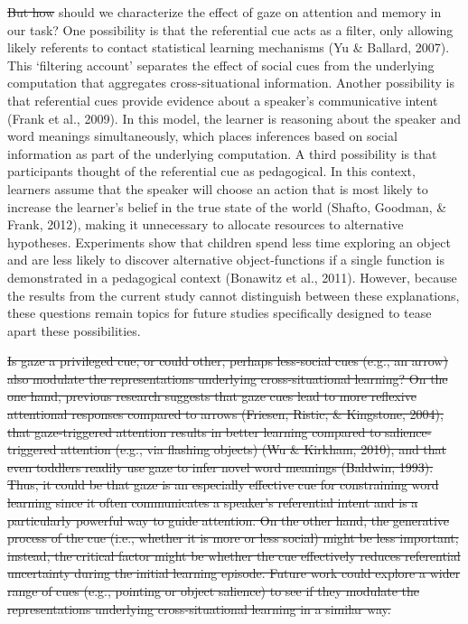 \documentclass[authoryear, review]{elsarticle}
\providecommand{\DIFaddtex}[1]{{\protect\color{blue}\uwave{#1}}} %
\providecommand{\DIFdeltex}[1]{{\protect\color{red}\sout{#1}}}                      %
\providecommand{\DIFaddbegin}{} %
\providecommand{\DIFaddend}{} %
\providecommand{\DIFdelbegin}{} %
\providecommand{\DIFdelend}{} %
\providecommand{\DIFadd}[1]{\texorpdfstring{\DIFaddtex{#1}}{#1}} %
\providecommand{\DIFdel}[1]{\texorpdfstring{\DIFdeltex{#1}}{}} %
\begin{document}
\DIFdelbegin \DIFdel{But how }\DIFdelend \DIFaddbegin \DIFadd{How }\DIFaddend should we characterize the effect of gaze on attention and memory in
our task? One possibility is that the referential cue acts as a filter,
only allowing likely referents to contact statistical learning
mechanisms (Yu \& Ballard, 2007). This `filtering account' separates the
effect of social cues from the underlying computation that aggregates
cross-situational information. Another possibility is that referential
cues provide evidence about a speaker's communicative intent (Frank et
al., 2009). In this model, the learner is reasoning about the speaker
and word meanings simultaneously, which places inferences based on
social information as part of the underlying computation. A third
possibility is that participants thought of the referential cue as
pedagogical. In this context, learners assume that the speaker will
choose an action that is most likely to increase the learner's belief in
the true state of the world (Shafto, Goodman, \& Frank, 2012), making it
unnecessary to allocate resources to alternative hypotheses. Experiments
show that children spend less time exploring an object and are less
likely to discover alternative object-functions if a single function is
demonstrated in a pedagogical context (Bonawitz et al., 2011). However,
because the results from the current study cannot distinguish between
these explanations, these questions remain topics for future studies
specifically designed to tease apart these possibilities.

\DIFdelbegin \DIFdel{Is gaze a privileged cue, or could other, perhaps less-social cues
(e.g., an arrow) also modulate the representations underlying
cross-situational learning? On the one hand, previous research suggests
that gaze cues lead to more reflexive attentional responses compared to
arrows (Friesen, Ristic, \& Kingstone, 2004), that gaze-triggered
attention results in better learning compared to salience-triggered
attention (e.g., via flashing objects) (Wu \& Kirkham, 2010), and that
even toddlers readily use gaze to infer novel word meanings (Baldwin,
1993). Thus, it could be that gaze is an especially effective cue for
constraining word learning since it often communicates a speaker's
referential intent and is a particularly powerful way to guide
attention. On the other hand, the generative process of the cue (i.e.,
whether it is more or less social) might be less important; instead, the
critical factor might be whether the cue effectively reduces referential
uncertainty during the initial learning episode. Future work could
explore a wider range of cues (e.g., pointing or object salience) to see
if they modulate the representations underlying cross-situational
learning in a similar way.
}%
\end{document}
